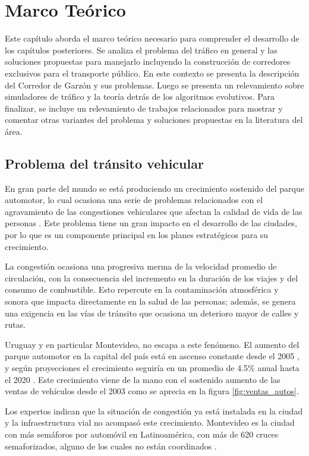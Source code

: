 \chapter{Marco Teórico}
Este capítulo aborda el marco teórico necesario para comprender el desarrollo de los capítulos posteriores. Se analiza el problema del tráfico en general y las soluciones propuestas para manejarlo incluyendo la construcción de corredores exclusivos para el transporte público. En este contexto se presenta la descripción del Corredor de Garzón y sus problemas. Luego se presenta un relevamiento sobre simuladores de tráfico y la teoría detrás de los algoritmos evolutivos. Para finalizar, se incluye un relevamiento de trabajos relacionados para mostrar y comentar otras variantes del problema y soluciones propuestas en la literatura del área.
\section{Problema del tránsito vehicular}

En gran parte del mundo se está produciendo un crecimiento sostenido del parque automotor, lo cual ocasiona una serie de problemas relacionados con el agravamiento de las congestiones vehiculares que afectan la calidad de vida de las personas \citep{Cepal2003}. Este problema tiene un gran impacto en el desarrollo de las ciudades, por lo que es un componente principal en los planes estratégicos para su crecimiento.

La congestión ocasiona una progresiva merma de la velocidad promedio de circulación, con la consecuencia del incremento en la duración de los viajes y del consumo de combustible. Esto repercute en la contaminación atmosférica y sonora que impacta directamente en la salud de las personas; además, se genera una exigencia en las vías de tránsito que ocasiona un deterioro mayor de calles y rutas.

Uruguay y en particular Montevideo, no escapa a este fenómeno. El aumento del parque automotor en la capital del país está en ascenso constante desde el 2005 \citep{INE2014}, y según proyecciones el crecimiento seguiría en un promedio de 4.5\% anual hasta el 2020 \citep{BBVA2013}. Este crecimiento viene de la mano con el sostenido aumento de las ventas de vehículos desde el 2003 como se aprecia en la figura \ref{fig:ventas_autos}.

Los expertos indican que la situación de congestión ya está instalada en la ciudad y la infraestructura vial no acompasó este crecimiento. Montevideo es la ciudad con más semáforos por automóvil en Latinoamérica, con más de 620 cruces semaforizados, alguno de los cuales no están coordinados \citep{Subrayado2013}.

